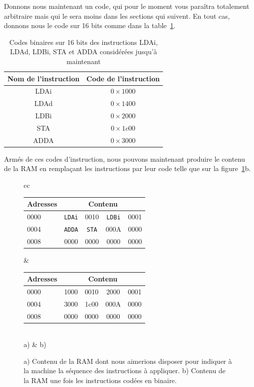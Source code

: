 Donnons nous maintenant un code, qui pour le moment vous paraîtra totalement arbitraire mais qui le sera moins dans les sections qui suivent. En tout cas, donnons nous le code sur 16 bits comme dans la table~\ref{table:code_op1}.

\begin{table}[htbp]
\centering\begin{tabular}{c|c}
Nom de l'instruction & Code de l'instruction \\
\hline
LDAi & $0\times1000$\\
LDAd & $0\times1400$\\
LDBi & $0\times2000$\\
STA  & $0\times1c00$\\
ADDA & $0\times3000$
\end{tabular}
\caption{\label{table:code_op1} Codes binaires sur 16 bits des instructions LDAi, LDAd, LDBi, STA et ADDA considérées jusqu'à maintenant}
\end{table}

Armés de ces codes d'instruction, nous pouvons maintenant produire le contenu de la RAM en remplaçant les instructions par leur code telle que sur la figure~\ref{fig:ram_data_prog}b.

\begin{figure}[htbp]
\centering\begin{tabular}{cc}
\begin{tabular}{l|cccc}
Adresses & \multicolumn{4}{c}{Contenu}\\
\hline
0000 & \texttt{LDAi} & 0010 & \texttt{LDBi} & 0001\\
0004 & \texttt{ADDA} & \texttt{STA} & 000A & 0000\\
0008 & 0000 & 0000 & 0000 & 0000
\end{tabular}& 
\begin{tabular}{l|cccc}
Adresses & \multicolumn{4}{c}{Contenu}\\
\hline
0000 & 1000 & 0010 & 2000 & 0001\\
0004 & 3000 & 1c00 & 000A & 0000\\
0008 & 0000 & 0000 & 0000 & 0000
\end{tabular}\\
a) & b)
\end{tabular}
\caption{\label{fig:ram_data_prog} a) Contenu de la RAM dont nous aimerions disposer pour indiquer à la machine la séquence des instructions à appliquer. b) Contenu de la RAM une fois les instructions codées en binaire.}
\end{figure}

